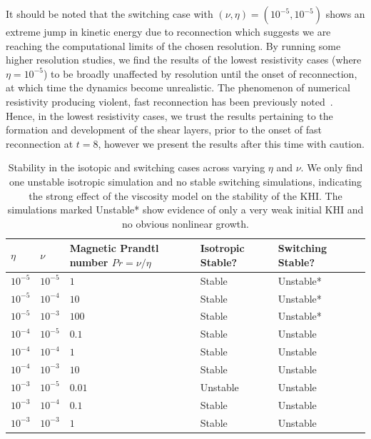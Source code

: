 It should be noted that the switching case with $(\nu, \eta) = (10^{-5}, 10^{-5})$ shows an extreme jump in kinetic energy due to reconnection which suggests we are reaching the computational limits of the chosen resolution. By running some higher resolution studies, we find the results of the lowest resistivity cases (where $\eta = 10^{-5}$) to be broadly unaffected by resolution until the onset of reconnection, at which time the dynamics become unrealistic. The phenomenon of numerical resistivity producing violent, fast reconnection has been previously noted~\cite{miyamaNumericalAstrophysicsProceedings2012}. Hence, in the lowest resistivity cases, we trust the results pertaining to the formation and development of the shear layers, prior to the onset of fast reconnection at $t=8$, however we present the results after this time with caution.

\begin{table}[]
\centering
\begin{tabular}{llllll}
$\eta$    & $\nu$    & Magnetic Prandtl number $Pr = \nu/\eta$ & Isotropic Stable? & Switching Stable? &  \\
\midrule
$10^{-5}$ & $10^{-5}$ & $1$ & Stable                 & Unstable*          &  \\
$10^{-5}$ & $10^{-4}$ & $10$ & Stable                 & Unstable*          &  \\
$10^{-5}$ & $10^{-3}$ & $100$ & Stable                 & Unstable*          &  \\
$10^{-4}$ & $10^{-5}$ & $0.1$ & Stable                 & Unstable                 &  \\
$10^{-4}$ & $10^{-4}$ & $1$ & Stable                 & Unstable                 &  \\
$10^{-4}$ & $10^{-3}$ & $10$ & Stable                 & Unstable                 &  \\
$10^{-3}$ & $10^{-5}$ & $0.01$ & Unstable                 & Unstable                 &  \\
$10^{-3}$ & $10^{-4}$ & $0.1$ & Stable                 & Unstable                 &  \\
$10^{-3}$ & $10^{-3}$ & $1$ & Stable                 & Unstable                 & 
\end{tabular}
\caption{Stability in the isotopic and switching cases across varying $\eta$ and $\nu$. We only find one unstable isotropic simulation and no stable switching simulations, indicating the strong effect of the viscosity model on the stability of the KHI. The simulations marked Unstable* show evidence of only a very weak initial KHI and no obvious nonlinear growth.}
\label{tab:stability}
\end{table}

